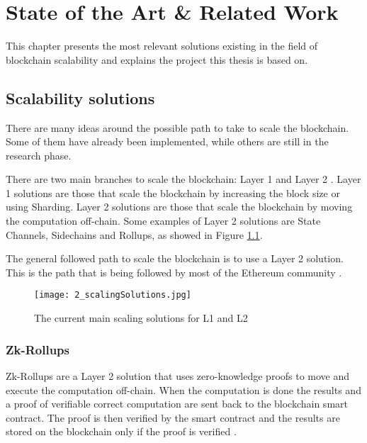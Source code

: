\chapter{State of the Art \& Related Work\label{cha:chapter2}}

This chapter presents the most relevant solutions existing in the field of blockchain scalability and explains the project this thesis is based on.
\section{Scalability solutions}
There are many ideas around the possible path to take to scale the blockchain. Some of them have already been implemented, while others are still in the research phase.

There are two main branches to scale the blockchain: Layer 1 and Layer 2 \cite{tyagi_study_2021,thibault_blockchain_2022}. Layer 1 solutions are those that scale the blockchain by increasing the block size or using Sharding. Layer 2 solutions are those that scale the blockchain by moving the computation off-chain. Some examples of Layer 2 solutions are State Channels, Sidechains and Rollups, as showed in Figure \ref{fig:2_scalingSolutions}.

The general followed path to scale the blockchain is to use a Layer 2 solution. This is the path that is being followed by most of the Ethereum community \cite{neiheiser_practical_2023}.

\begin{figure}[ht]
  \centering
  \texttt{[image: 2\_scalingSolutions.jpg]}
  \caption[Scaling Solutions]{The current main scaling solutions for L1 and L2 \footnotemark}  
  \label{fig:2_scalingSolutions}
\end{figure} 

\subsection{Zk-Rollups}
\label{sec:2_zkRollups}
Zk-Rollups are a Layer 2 solution that uses zero-knowledge proofs to move and execute the computation off-chain. When the computation is done the results and a proof of verifiable correct computation are sent back to the blockchain smart contract. The proof is then verified by the smart contract and the results are stored on the blockchain only if the proof is verified \cite{tyagi_study_2021}.

